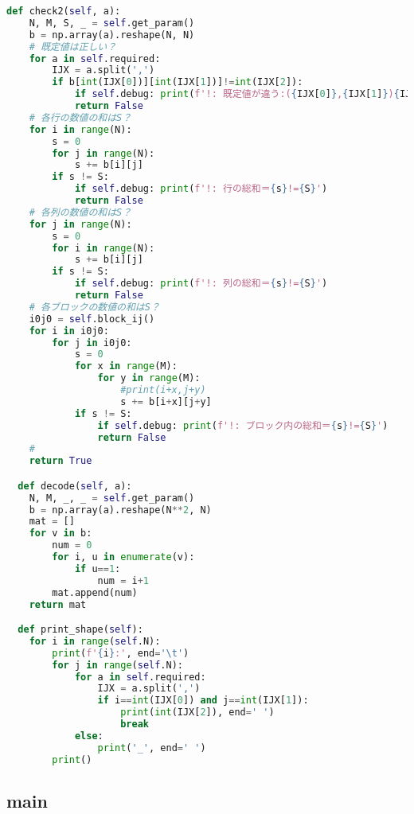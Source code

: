 \documentclass[uplatex,dvipdfmx,a4paper,11pt,oneside,openany]{jsbook}
\begin{document}
\begin{lstlisting}[language=Python]
  def check2(self, a):
    N, M, S, _ = self.get_param()
    b = np.array(a).reshape(N, N)
    # 既定値は正しい？
    for a in self.required:
        IJX = a.split(',')
        if b[int(IJX[0])][int(IJX[1])]!=int(IJX[2]):
            if self.debug: print(f'!: 既定値が違う:({IJX[0]},{IJX[1]}){IJX[2]}!={b[int(IJX[0])][int(IJX[1])]}')
            return False
    # 各行の数値の和はS？
    for i in range(N):
        s = 0
        for j in range(N):
            s += b[i][j]
        if s != S:
            if self.debug: print(f'!: 行の総和＝{s}!={S}')
            return False
    # 各列の数値の和はS？
    for j in range(N):
        s = 0
        for i in range(N):
            s += b[i][j]
        if s != S:
            if self.debug: print(f'!: 列の総和＝{s}!={S}')
            return False
    # 各ブロックの数値の和はS？
    i0j0 = self.block_ij()
    for i in i0j0:
        for j in i0j0:
            s = 0
            for x in range(M):
                for y in range(M):
                    #print(i+x,j+y)
                    s += b[i+x][j+y]
            if s != S:
                if self.debug: print(f'!: ブロック内の総和＝{s}!={S}')
                return False
    #
    return True

  def decode(self, a):
    N, M, _, _ = self.get_param()
    b = np.array(a).reshape(N**2, N)
    mat = []
    for v in b:
        num = 0
        for i, u in enumerate(v):
            if u==1:
                num = i+1
        mat.append(num)
    return mat

  def print_shape(self):
    for i in range(self.N):
        print(f'{i}:', end='\t')
        for j in range(self.N):
            for a in self.required:
                IJX = a.split(',')
                if i==int(IJX[0]) and j==int(IJX[1]):
                    print(int(IJX[2]), end=' ')
                    break
            else:
                print('_', end=' ')
        print()
\end{lstlisting}

\subsection{main}
\end{document}
